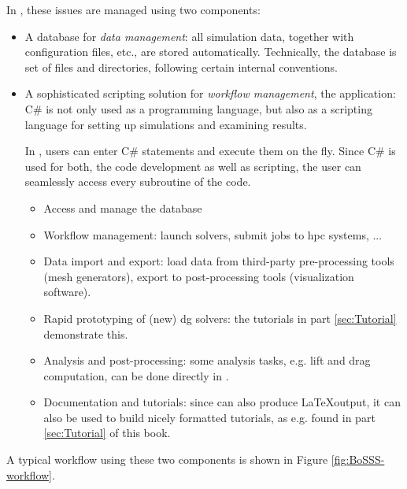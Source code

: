 \documentclass[a4paper,10pt]{report} %
\begin{document}
In \BoSSS{}, these issues are managed using two components:
\begin{itemize}
\item
A database for \emph{data management}:
all simulation data, together with configuration files, etc., are stored automatically.
Technically, the database is set of files and directories, following 
certain internal conventions.

\item
A sophisticated scripting solution for \emph{workflow management}, the \BoSSSpad{} application:
C\# is not only used as a programming language, but also as a scripting language
for setting up simulations and examining results.

In \BoSSSpad{}, users can enter C\# statements and execute them on the fly.
Since C\# is used for both, the code development as well as scripting,
the user can seamlessly access every subroutine of the code.

\begin{itemize}
\item
Access and manage the database

\item
Workflow management: launch solvers, submit jobs to hpc systems, ...

\item
Data import and export: load data from third-party pre-processing tools (mesh generators),
export to post-processing tools (visualization software).

\item
Rapid prototyping of (new) \ac{dg} solvers: the tutorials in part \ref{sec:Tutorial} demonstrate this.

\item
Analysis and post-processing: some analysis tasks, e.g. lift and drag computation,
can be done directly in \BoSSSpad{}.

\item
Documentation and tutorials: 
since \BoSSSpad{} can also produce \LaTeX output, it can also be used to 
build nicely formatted tutorials, as e.g. found in  part \ref{sec:Tutorial} of this book.

\end{itemize}
\end{itemize}
A typical workflow using these two components is shown in Figure \ref{fig:BoSSS-workflow}.
\end{document}
